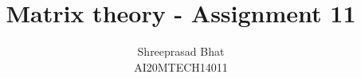 \documentclass[journal,12pt,twocolumn]{IEEEtran}
\begin{document}
\makeatletter
{}
\makeatother
\let\StandardTheFigure\thefigure
\let\vec\mathbf
\renewcommand{\thefigure}{\theproblem}
\def\putbox#1#2#3{\makebox[0in][l]{\makebox[#1][l]{}\raisebox{\baselineskip}[0in][0in]{\raisebox{#2}[0in][0in]{#3}}}}
     \def\rightbox#1{\makebox[0in][r]{#1}}
     \def\centbox#1{\makebox[0in]{#1}}
     \def\topbox#1{\raisebox{-\baselineskip}[0in][0in]{#1}}
     \def\midbox#1{\raisebox{-0.5\baselineskip}[0in][0in]{#1}}
\vspace{3cm}
\title{Matrix theory - Assignment 11}
\author{Shreeprasad Bhat\\AI20MTECH14011}
%
%
%
% 
%
\end{document}
